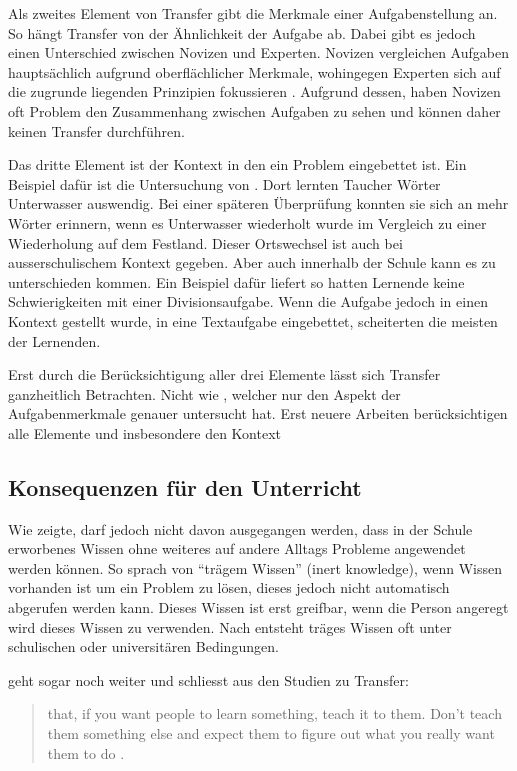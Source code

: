 Als zweites Element von Transfer gibt \citeauthor{Marini1995} die Merkmale einer Aufgabenstellung an. So hängt Transfer von der Ähnlichkeit der Aufgabe ab. Dabei gibt es jedoch einen Unterschied zwischen Novizen und Experten. Novizen vergleichen Aufgaben hauptsächlich aufgrund oberflächlicher Merkmale, wohingegen Experten sich auf die zugrunde liegenden Prinzipien fokussieren \citep[s. S. 279]{Marini1995}. Aufgrund dessen, haben Novizen oft Problem den Zusammenhang zwischen Aufgaben zu sehen und können daher keinen Transfer durchführen.

Das dritte Element ist der Kontext in den ein Problem eingebettet ist. Ein Beispiel dafür ist die Untersuchung von \citet{Godden1975}. Dort lernten Taucher Wörter Unterwasser auswendig. Bei einer späteren Überprüfung konnten sie sich an mehr Wörter erinnern, wenn es Unterwasser wiederholt wurde im Vergleich zu einer Wiederholung auf dem Festland. Dieser Ortswechsel ist auch bei ausserschulischem Kontext gegeben. Aber auch innerhalb der Schule kann es zu unterschieden kommen. Ein Beispiel dafür liefert \citet{Schoenfeld1988} so hatten Lernende keine Schwierigkeiten mit einer Divisionsaufgabe. Wenn die Aufgabe jedoch in einen Kontext gestellt wurde, in eine Textaufgabe eingebettet, scheiterten die meisten der Lernenden. 

Erst durch die Berücksichtigung aller drei Elemente lässt sich Transfer ganzheitlich Betrachten. Nicht wie  \citet{Woodworth1901}, welcher nur den Aspekt der Aufgabenmerkmale genauer untersucht hat. Erst neuere Arbeiten berücksichtigen alle Elemente und insbesondere den Kontext \citep{Lobato2002a, Detterman1993, Greeno1996}

\subsection{Konsequenzen für den Unterricht}

Wie \citet{claxton1990} zeigte, darf jedoch nicht davon ausgegangen werden, dass in der Schule erworbenes Wissen ohne weiteres auf andere Alltags Probleme angewendet werden können. So sprach \citet{Whitehead1929} von "`trägem Wissen"' (inert knowledge), wenn Wissen vorhanden ist um ein Problem zu lösen, dieses jedoch nicht automatisch abgerufen werden kann. Dieses Wissen ist erst greifbar, wenn die Person angeregt wird dieses Wissen zu verwenden. Nach \citet{Whitehead1929} entsteht träges Wissen oft unter schulischen oder universitären Bedingungen. 


\citeauthor{Detterman1993} geht sogar noch weiter und schliesst aus den Studien zu Transfer:
\begin{quote}
that, if you want people to learn something, teach it to them. Don't teach them something else and expect them to figure out what you really want them to do \citep[S. 21]{Detterman1993}.
\end{quote}

